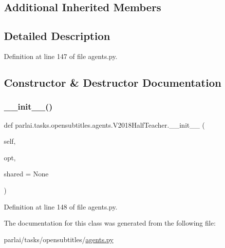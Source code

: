 \subsection*{Additional Inherited Members}


\subsection{Detailed Description}


Definition at line 147 of file agents.\+py.



\subsection{Constructor \& Destructor Documentation}
\mbox{\label{classparlai_1_1tasks_1_1opensubtitles_1_1agents_1_1V2018HalfTeacher_ac42e92db06e46aa2a9fef8883bb17117}} 
\subsubsection{\texorpdfstring{\+\_\+\+\_\+init\+\_\+\+\_\+()}{\_\_init\_\_()}}
{\footnotesize\ttfamily def parlai.\+tasks.\+opensubtitles.\+agents.\+V2018\+Half\+Teacher.\+\_\+\+\_\+init\+\_\+\+\_\+ (\begin{DoxyParamCaption}\item[{}]{self,  }\item[{}]{opt,  }\item[{}]{shared = {\ttfamily None} }\end{DoxyParamCaption})}



Definition at line 148 of file agents.\+py.



The documentation for this class was generated from the following file\+:\begin{DoxyCompactItemize}
\item 
parlai/tasks/opensubtitles/\hyperlink{parlai_2tasks_2opensubtitles_2agents_8py}{agents.\+py}\end{DoxyCompactItemize}
